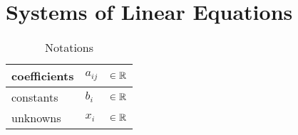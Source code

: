 \chapter{Systems of Linear Equations}




\begin{customArrayStretch}{1.3}
\begin{table}[H]
    \centering
    \begin{tabular}{| l | l  l |}
        \hline

        coefficients & $a_{ij}$    & $\in \mathbb{R}$ \\ \hline

        constants & $b_{i}$     & $\in \mathbb{R}$ \\ \hline

        unknowns & $x_{i}$     & $\in \mathbb{R}$ \\ \hline

    \end{tabular}
    \caption*{Notations}
\end{table}
\end{customArrayStretch}


\vspace{0.5cm}


